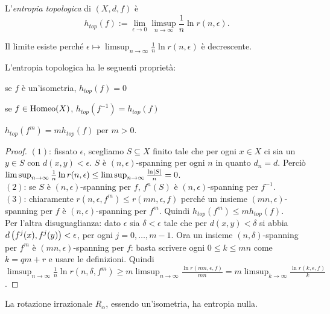 \begin{defi}L'\emph{entropia topologica} di $(X,d,f)$ è
\[ h_{top}(f):=\lim_{\epsilon\to 0}\limsup_{n\to\infty}\frac{1}{n}\ln r(n,\epsilon). \]
\end{defi}

Il limite esiste perché $\epsilon\mapsto\limsup_{n\to\infty}\frac{1}{n}\ln r(n,\epsilon)$ è decrescente.

\begin{prop}L'entropia topologica ha le seguenti proprietà:
\begin{lista}
\item se $f$ è un'isometria, $h_{top}(f)=0$
\item se $f\in\operatorname{Homeo}(X)$, $h_{top}(f^{-1})=h_{top}(f)$
\item $h_{top}(f^m)=mh_{top}(f)$ per $m>0$.
\end{lista}
\end{prop}

\begin{proof}$(1)$: fissato $\epsilon$, scegliamo $S\subseteq X$ finito tale che per ogni $x\in X$
ci sia un $y\in S$ con $d(x,y)<\epsilon$. $S$ è $(n,\epsilon)$-spanning per ogni $n$ in quanto $d_n=d$.
Perciò $\limsup_{n\to\infty}\frac{1}{n}\ln r(n,\epsilon)\le\limsup_{n\to\infty}\frac{\ln\left|S\right|}{n}=0$. \\
$(2)$: se $S$ è $(n,\epsilon)$-spanning per $f$, $f^n(S)$ è $(n,\epsilon)$-spanning per $f^{-1}$. \\
$(3)$: chiaramente $r(n,\epsilon,f^m)\le r(mn,\epsilon,f)$ perché un insieme $(mn,\epsilon)$-spanning per $f$
è $(n,\epsilon)$-spanning per $f^m$. Quindi $h_{top}(f^m)\le m h_{top}(f)$. \\
Per l'altra disuguaglianza: dato $\epsilon$ sia $\delta<\epsilon$ tale che per $d(x,y)<\delta$ si abbia $d\left(f^j(x),f^j(y)\right)<\epsilon$,
per ogni $j=0,\dots,m-1$. Ora un insieme $(n,\delta)$-spanning per $f^m$ è $(mn,\epsilon)$-spanning per $f$:
basta scrivere ogni $0\le k\le mn$ come $k=qm+r$ e usare le definizioni.
Quindi $\limsup_{n\to\infty}\frac{1}{n}\ln r(n,\delta,f^m)\ge m\limsup_{n\to\infty}\frac{\ln r(mn,\epsilon,f)}{mn}
=m\limsup_{k\to\infty}\frac{\ln r(k,\epsilon,f)}{k}$.
\end{proof}

\begin{esempio}La rotazione irrazionale $R_\alpha$, essendo un'isometria, ha entropia nulla.
\end{esempio}

